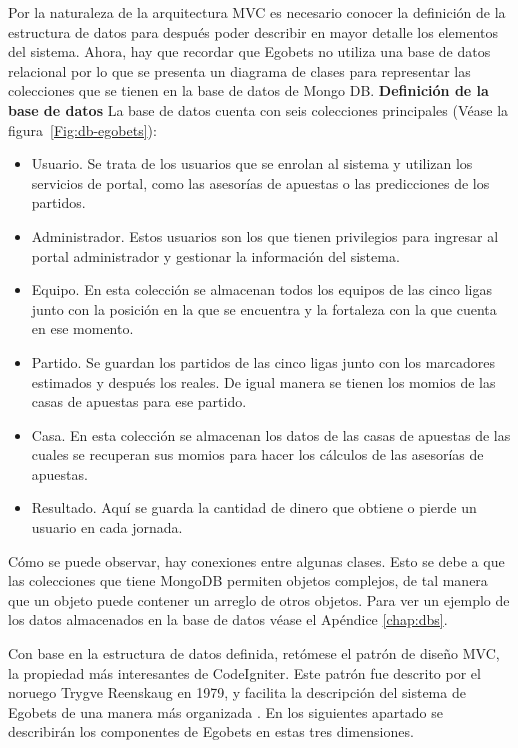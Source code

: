 	Por la naturaleza de la arquitectura MVC es necesario conocer la definición de la estructura de datos para después poder describir en mayor detalle los elementos del sistema. Ahora, hay que recordar que Egobets no utiliza una base de datos relacional por lo que se presenta un diagrama de clases para representar las colecciones que se tienen en la base de datos de Mongo DB.
	\textbf{Definición de la base de datos}
	La base de datos cuenta con seis colecciones principales (Véase la figura~\ref{Fig:db-egobets}):

	\begin{itemize}
		\item Usuario. Se trata de los usuarios que se enrolan al sistema y utilizan los servicios de portal, como las asesorías de apuestas o las predicciones de los partidos.
		\item Administrador. Estos usuarios son los que tienen privilegios para ingresar al portal administrador y gestionar la información del sistema.
		\item Equipo. En esta colección se almacenan todos los equipos de las cinco ligas junto con la posición en la que se encuentra  y la fortaleza con la que cuenta en ese momento.
		\item Partido. Se guardan los partidos de las cinco ligas junto con los marcadores estimados y después los reales. De igual manera se tienen los momios de las casas de apuestas para ese partido.
		\item Casa. En esta colección se almacenan los datos de las casas de apuestas de las cuales se recuperan sus momios para hacer los cálculos de las asesorías de apuestas.
		\item Resultado. Aquí se guarda la cantidad de dinero que obtiene o pierde un usuario en cada jornada.
	\end{itemize}
	Cómo se puede observar, hay conexiones entre algunas clases. Esto se debe a que las colecciones que tiene MongoDB permiten objetos complejos, de tal manera que un objeto puede contener un arreglo de otros objetos. Para ver un ejemplo de los datos almacenados en la base de datos véase el Apéndice \ref{chap:dbs}.
	
	Con base en la estructura de datos definida, retómese el patrón de diseño MVC, la propiedad más interesantes de CodeIgniter. Este patrón fue descrito por el noruego Trygve Reenskaug en 1979, y facilita la descripción del sistema de Egobets de una manera más organizada \cite{upton2007codeigniter} \cite{alfredo2005ingenieria}. En los siguientes apartado se describirán  los componentes de Egobets en estas tres dimensiones.
	

